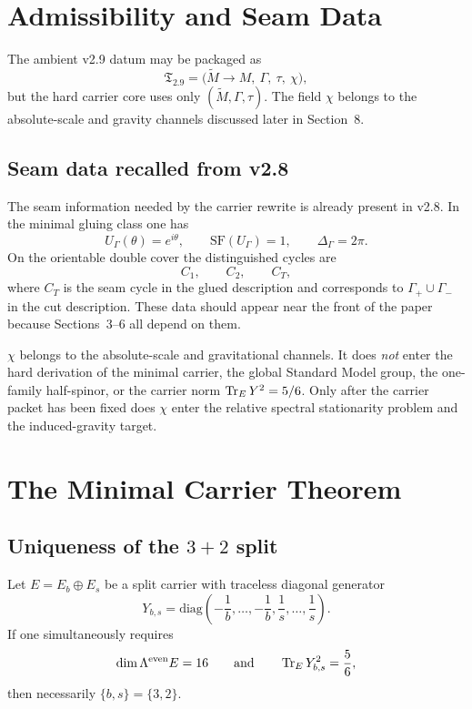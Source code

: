\section{Admissibility and Seam Data}

The ambient v2.9 datum may be packaged as
\[
\mathfrak T_{2.9} = \bigl(\widetilde M \to M,\ \Gamma,\ \tau,\ \chi\bigr),
\]
but the hard carrier core uses only $(\widetilde M,\Gamma,\tau)$. The field $\chi$ belongs to the absolute-scale and gravity channels discussed later in Section~8.

\subsection{Seam data recalled from v2.8}

The seam information needed by the carrier rewrite is already present in v2.8. In the minimal gluing class one has
\[
U_\Gamma(\theta)=e^{i\theta},
\qquad
\mathrm{SF}(U_\Gamma)=1,
\qquad
\Delta_\Gamma=2\pi.
\]
On the orientable double cover the distinguished cycles are
\[
C_1,\qquad C_2,\qquad C_T,
\]
where $C_T$ is the seam cycle in the glued description and corresponds to $\Gamma_+\cup\Gamma_-$ in the cut description. These data should appear near the front of the paper because Sections~3--6 all depend on them.

\begin{tcolorbox}[colback=blue!3, colframe=blue!50!black,
    title={\textbf{What $\chi$ does and does not do}}, fonttitle=\bfseries\small]
$\chi$ belongs to the absolute-scale and gravitational channels. It does \emph{not} enter the hard derivation of the minimal carrier, the global Standard Model group, the one-family half-spinor, or the carrier norm $\operatorname{Tr}_EY^2=5/6$. Only after the carrier packet has been fixed does $\chi$ enter the relative spectral stationarity problem and the induced-gravity target.
\end{tcolorbox}

\section{The Minimal Carrier Theorem}

\subsection{Uniqueness of the \texorpdfstring{$3+2$}{3+2} split}

\begin{theorem}
Let $E=E_b\oplus E_s$ be a split carrier with traceless diagonal generator
\[
Y_{b,s}=\mathrm{diag}\!\left(-\frac1b,\ldots,-\frac1b,\frac1s,\ldots,\frac1s\right).
\]
If one simultaneously requires
\[
\dim \Lambda^{\mathrm{even}}E = 16
\qquad\text{and}\qquad
\operatorname{Tr}_E Y_{b,s}^2 = \frac56,
\]
then necessarily $\{b,s\}=\{3,2\}$.
\end{theorem}

